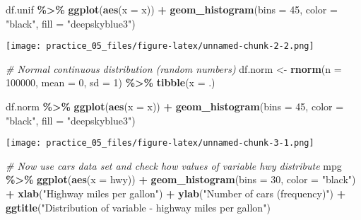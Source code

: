 \documentclass[
]{article}
\newenvironment{Shaded}{\begin{snugshade}}{\end{snugshade}}
\newcommand{\AttributeTok}[1]{\textcolor[rgb]{0.13,0.29,0.53}{#1}}
\newcommand{\CommentTok}[1]{\textcolor[rgb]{0.56,0.35,0.01}{\textit{#1}}}
\newcommand{\DecValTok}[1]{\textcolor[rgb]{0.00,0.00,0.81}{#1}}
\newcommand{\FunctionTok}[1]{\textcolor[rgb]{0.13,0.29,0.53}{\textbf{#1}}}
\newcommand{\NormalTok}[1]{#1}
\newcommand{\OtherTok}[1]{\textcolor[rgb]{0.56,0.35,0.01}{#1}}
\newcommand{\SpecialCharTok}[1]{\textcolor[rgb]{0.81,0.36,0.00}{\textbf{#1}}}
\newcommand{\StringTok}[1]{\textcolor[rgb]{0.31,0.60,0.02}{#1}}
\begin{document}
\begin{Shaded}
\begin{Highlighting}[]
\NormalTok{df.unif }\SpecialCharTok{\%\textgreater{}\%} 
  \FunctionTok{ggplot}\NormalTok{(}\FunctionTok{aes}\NormalTok{(}\AttributeTok{x =}\NormalTok{ x)) }\SpecialCharTok{+}
  \FunctionTok{geom\_histogram}\NormalTok{(}\AttributeTok{bins =} \DecValTok{45}\NormalTok{,  }
                 \AttributeTok{color =} \StringTok{"black"}\NormalTok{,}
                 \AttributeTok{fill =} \StringTok{"deepskyblue3"}\NormalTok{)}
\end{Highlighting}
\end{Shaded}

\texttt{[image: practice\_05\_files/figure-latex/unnamed-chunk-2-2.png]}

\begin{Shaded}
\begin{Highlighting}[]
\CommentTok{\#   Normal continuous distribution (random numbers)}
\NormalTok{df.norm }\OtherTok{\textless{}{-}} \FunctionTok{rnorm}\NormalTok{(}\AttributeTok{n =} \DecValTok{100000}\NormalTok{, }\AttributeTok{mean =} \DecValTok{0}\NormalTok{, }\AttributeTok{sd =} \DecValTok{1}\NormalTok{) }\SpecialCharTok{\%\textgreater{}\%} 
  \FunctionTok{tibble}\NormalTok{(}\AttributeTok{x =}\NormalTok{ .)}

\NormalTok{df.norm }\SpecialCharTok{\%\textgreater{}\%} 
\FunctionTok{ggplot}\NormalTok{(}\FunctionTok{aes}\NormalTok{(}\AttributeTok{x =}\NormalTok{ x)) }\SpecialCharTok{+}
  \FunctionTok{geom\_histogram}\NormalTok{(}\AttributeTok{bins =} \DecValTok{45}\NormalTok{,  }
                 \AttributeTok{color =} \StringTok{"black"}\NormalTok{,}
                 \AttributeTok{fill =} \StringTok{"deepskyblue3"}\NormalTok{)}
\end{Highlighting}
\end{Shaded}

\texttt{[image: practice\_05\_files/figure-latex/unnamed-chunk-3-1.png]}

\begin{Shaded}
\begin{Highlighting}[]
\CommentTok{\#   Now use cars data set and check how values of variable hwy distribute}
\NormalTok{mpg }\SpecialCharTok{\%\textgreater{}\%} 
  \FunctionTok{ggplot}\NormalTok{(}\FunctionTok{aes}\NormalTok{(}\AttributeTok{x =}\NormalTok{ hwy)) }\SpecialCharTok{+}
  \FunctionTok{geom\_histogram}\NormalTok{(}\AttributeTok{bins =} \DecValTok{30}\NormalTok{,}
                 \AttributeTok{color =} \StringTok{"black"}\NormalTok{) }\SpecialCharTok{+}
  \FunctionTok{xlab}\NormalTok{(}\StringTok{"Highway miles per gallon"}\NormalTok{) }\SpecialCharTok{+}
  \FunctionTok{ylab}\NormalTok{(}\StringTok{"Number of cars (frequency)"}\NormalTok{) }\SpecialCharTok{+}
  \FunctionTok{ggtitle}\NormalTok{(}\StringTok{"Distribution of variable {-} highway miles per gallon"}\NormalTok{)}
\end{Highlighting}
\end{Shaded}
\end{document}
